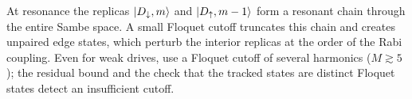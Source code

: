 \begin{caution}
At resonance the replicas $\lvert D_{\downarrow},m\rangle$ and $\lvert D_{\uparrow},m-1\rangle$ form a resonant chain through
the entire Sambe space. A small Floquet cutoff truncates this chain and creates unpaired edge
states, which perturb the interior replicas at the order of the Rabi coupling. Even for weak
drives, use a Floquet cutoff of several harmonics ($M\gtrsim5$); the residual bound and the
check that the tracked states are distinct Floquet states detect an insufficient cutoff.
\end{caution}

